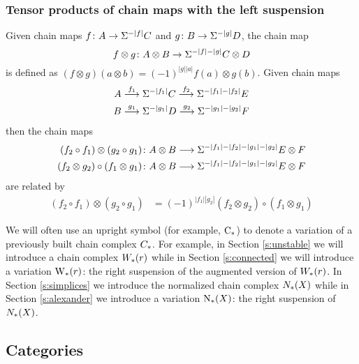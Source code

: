 \subsubsection{Tensor products of chain maps with the left suspension} Given chain maps $f\colon A\to \Sigma^{-|f|}C$ and $g\colon B\to \Sigma^{-|g|}D$, the chain map
\[
	f\otimes g\colon A\otimes B\to \Sigma^{-|f|-|g|}C\otimes D
\]
is defined as $(f\otimes g)(a\otimes b) = (-1)^{|g||a|} f(a)\otimes g(b)$. Given chain maps
\begin{align*}
	A & \overset{f_1}{\longrightarrow} \Sigma^{-|f_1|} C \overset{f_2}{\longrightarrow} \Sigma^{-|f_1|-|f_2|} E \\
	B & \overset{g_1}{\longrightarrow} \Sigma^{-|g_1|} D \overset{g_2}{\longrightarrow} \Sigma^{-|g_1|-|g_2|} F \\
\end{align*}
then the chain maps
\begin{align*}
(f_2\circ f_1)\otimes (g_2\circ g_1)\colon &A\otimes B\longrightarrow \Sigma^{-|f_1|-|f_2|-|g_1|-|g_2|}E\otimes F
\\
(f_2\otimes g_2)\circ (f_1\otimes g_1)\colon &A\otimes B\longrightarrow \Sigma^{-|f_1|-|f_2|-|g_1|-|g_2|}E\otimes F
\end{align*}
 are related by
\begin{align*}
	(f_2\circ f_1)\otimes (g_2\circ g_1) &= (-1)^{|f_1||g_2|}(f_2\otimes g_2)\circ (f_1\otimes g_1)
\end{align*}
\begin{notation}
	We will often use an upright symbol (for example, $\operatorname{C}_{*}$) to denote a variation of a previously built chain complex $C_{*}$. For example, in Section \ref{s:unstable} we will introduce a chain complex $W_{*}(r)$ while in Section \ref{s:connected} we will introduce a variation $\operatorname{W}_{*}(r)$: the right suspension of the augmented version of $W_{*}(r)$. In Section \ref{s:simplices} we introduce the normalized chain complex $N_{*}(X)$ while in Section \ref{s:alexander} we introduce a variation $\operatorname{N}_{*}(X)$: the right suspension of $N_{*}(X)$.
\end{notation}



\subsection{Categories}\label{s:categories}

